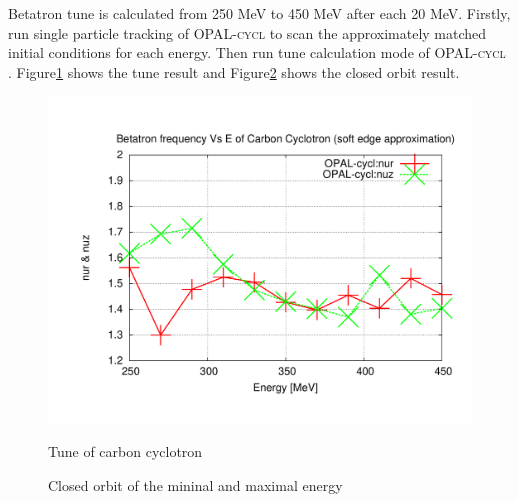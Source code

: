 \documentclass[12pt,a4paper]{report}
\newcommand{\opalcycl}{\textsc{OPAL-cycl }}
\begin{document}
Betatron tune is calculated from 250 MeV to 450 MeV after each 20 MeV. Firstly, run single particle tracking of \opalcycl to scan the approximately matched initial 
conditions for each energy. Then run tune calculation mode of \opalcycl. Figure\ref{fig:carbontune} shows the tune result and Figure\ref{fig:carbonorbit} shows 
the closed orbit result.   
\begin{figure}[ht]
    \centering 
	{\includegraphics[width=13cm]{tune.pdf}}
	\caption{Tune of carbon cyclotron}
	\label{fig:carbontune}
\end{figure}
\begin{figure}[ht]
    \centering
	\caption{Closed orbit of the mininal and maximal energy}
	\label{fig:carbonorbit}
\end{figure}
\end{document}
